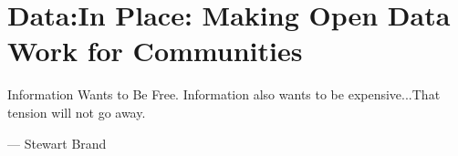 \chapter[Data:In Place]{Data:In Place: Making Open Data Work for Communities}
\label{chap:datainplace}

\ifpdf
    \graphicspath{{Chapter4/Figs/Raster/}{Chapter4/Figs/PDF/}{Chapter4/Figs/}}
\else
    \graphicspath{{Chapter4/Figs/Vector/}{Chapter4/Figs/}}
\fi

\epigraph{Information Wants to Be Free. Information also wants to be expensive...That tension will not go away.}{--- \textup{Stewart Brand}}

